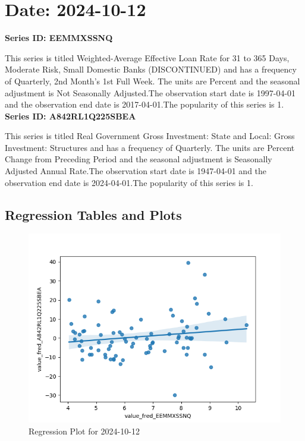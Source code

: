 \section{Date: 2024-10-12}
\noindent \textbf{Series ID: EEMMXSSNQ} 

\noindent This series is titled Weighted-Average Effective Loan Rate for 31 to 365 Days, Moderate Risk, Small Domestic Banks (DISCONTINUED) and has a frequency of Quarterly, 2nd Month's 1st Full Week. The units are Percent and the seasonal adjustment is Not Seasonally Adjusted.The observation start date is 1997-04-01 and the observation end date is 2017-04-01.The popularity of this series is 1. \\ 

\noindent \textbf{Series ID: A842RL1Q225SBEA} 

\noindent This series is titled Real Government Gross Investment: State and Local: Gross Investment: Structures and has a frequency of Quarterly. The units are Percent Change from Preceding Period and the seasonal adjustment is Seasonally Adjusted Annual Rate.The observation start date is 1947-04-01 and the observation end date is 2024-04-01.The popularity of this series is 1. \\ 

\subsection{Regression Tables and Plots}


\begin{figure}
\centering
\includegraphics[scale = 0.9]{plots/plot_2024-10-12.png}
\caption{Regression Plot for 2024-10-12}
\end{figure}
\newpage
